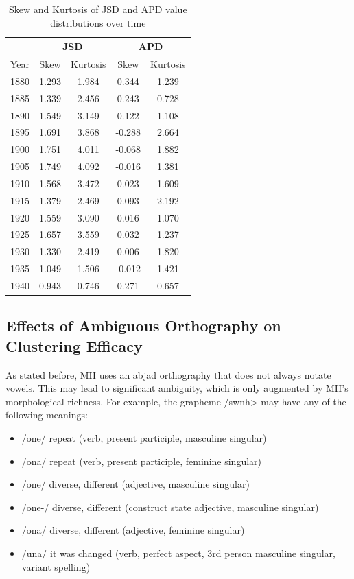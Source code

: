 \documentclass[10pt, a4paper]{article}
\begin{document}
\begin{table}[!h]
\label{SkewKurtosis_JSDandAPD}
\begin{center}
\begin{tabularx}{\columnwidth}{|X|c|c|c|c|}

      \hline
       &\multicolumn{2}{c|}{JSD}&\multicolumn{2}{c|}{APD}\\
       \hline
      Year&Skew&Kurtosis&Skew&Kurtosis\\
      \hline
      1880&1.293&1.984&0.344&1.239\\
      \hline
      1885&1.339&2.456&0.243&0.728\\
      \hline
      1890&1.549&3.149&0.122&1.108\\
      \hline
      1895&1.691&3.868&-0.288&2.664\\
      \hline
      1900&1.751&4.011&-0.068&1.882\\
      \hline
      1905&1.749&4.092&-0.016&1.381\\
      \hline
      1910&1.568&3.472&0.023&1.609\\
      \hline
      1915&1.379&2.469&0.093&2.192\\
      \hline
      1920&1.559&3.090&0.016&1.070\\
      \hline
      1925&1.657&3.559&0.032&1.237\\
      \hline
      1930&1.330&2.419&0.006&1.820\\
      \hline
      1935&1.049&1.506&-0.012&1.421\\
      \hline
      1940&0.943&0.746&0.271&0.657\\
      \hline

\end{tabularx}
\caption{Skew and Kurtosis of JSD and APD value distributions over time}
 \end{center}
\end{table}

\subsection{Effects of Ambiguous Orthography on Clustering Efficacy}
As stated before, MH uses an abjad orthography that does not always notate vowels. This may lead to significant ambiguity, which is only augmented by MH's morphological richness. For example, the grapheme \</swnh> may have any of the following meanings:
\begin{itemize}
    \item /\textesh one/ repeat (verb, present participle, masculine singular)
    \item /\textesh ona/ repeat (verb, present participle, feminine singular)
    \item /\textesh one/ diverse, different (adjective, masculine singular)
    \item /\textesh one-/ diverse, different (construct state adjective, masculine singular)
    \item /\textesh ona/ diverse, different (adjective, feminine singular)
    \item /\textesh una/ it was changed (verb, perfect aspect, 3rd person masculine singular, variant spelling)
\end{itemize}
\end{document}
